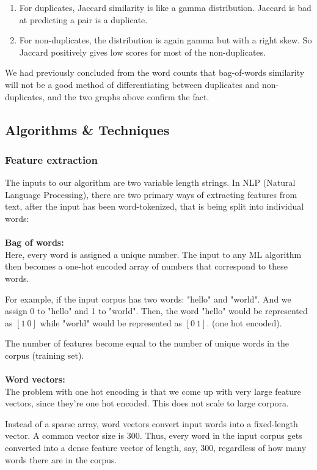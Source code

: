 \documentclass{article}
\begin{document}
\begin{enumerate}
\item{For duplicates, Jaccard similarity is like a gamma distribution. Jaccard is bad at predicting a pair is a duplicate.}
\item{For non-duplicates, the distribution is again gamma but with a right skew. So Jaccard positively gives low scores for most of the non-duplicates.}
\end{enumerate}

We had previously concluded from the word counts that bag-of-words similarity will not be a good method of differentiating between duplicates and non-duplicates, and the two graphs above confirm the fact.

\subsection{Algorithms \& Techniques}

\subsubsection{Feature extraction}

The inputs to our algorithm are two variable length strings. In NLP (Natural Language Processing), there are two primary ways of extracting features from text, after the input has been word-tokenized, that is being split into individual words:
\\\\
\noindent\textbf{Bag of words:}\\
Here, every word is assigned a unique number. The input to any ML algorithm then becomes a one-hot encoded array of numbers that correspond to these words.

For example, if the input corpus has two words: "hello" and "world". And we assign 0 to "hello" and 1 to "world". Then, the word "hello" would be represented as $[1\ 0]$ while "world" would be represented as $[0\ 1]$. (one hot encoded).

The number of features become equal to the number of unique words in the corpus (training set).
\\\\
\noindent\textbf{Word vectors:}\\
The problem with one hot encoding is that we come up with very large feature vectors, since they're one hot encoded. This does not scale to large corpora.

Instead of a sparse array, word vectors convert input words into a fixed-length vector. A common vector size is 300. Thus, every word in the input corpus gets converted into a dense feature vector of length, say, 300, regardless of how many words there are in the corpus.
\end{document}
